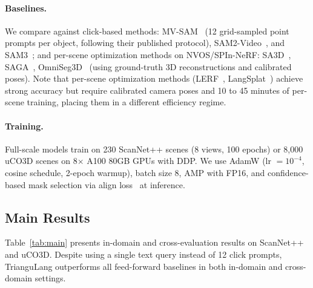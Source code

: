 \paragraph{Baselines.}
We compare against click-based methods: MV-SAM~\cite{mvsam} (12 grid-sampled point prompts per object, following their published protocol), SAM2-Video~\cite{sam2}, and SAM3~\cite{sam3}; and per-scene optimization methods on NVOS/SPIn-NeRF: SA3D~\cite{SA3D}, SAGA~\cite{SAGA}, OmniSeg3D~\cite{omniseg3d} (using ground-truth 3D reconstructions and calibrated poses). Note that per-scene optimization methods (LERF~\cite{lerf}, LangSplat~\cite{langsplat}) achieve strong accuracy but require calibrated camera poses and 10 to 45 minutes of per-scene training, placing them in a different efficiency regime.

\paragraph{Training.}
Full-scale models train on 230 ScanNet++ scenes (8 views, 100 epochs) or 8,000 uCO3D scenes on 8$\times$ A100 80GB GPUs with DDP. We use AdamW (lr $= 10^{-4}$, cosine schedule, 2-epoch warmup), batch size 8, AMP with FP16, and confidence-based mask selection via align loss~\cite{align2024} at inference.

\subsection{Main Results}

Table~\ref{tab:main} presents in-domain and cross-evaluation results on ScanNet++ and uCO3D. Despite using a single text query instead of 12 click prompts, TrianguLang outperforms all feed-forward baselines in both in-domain and cross-domain settings.

